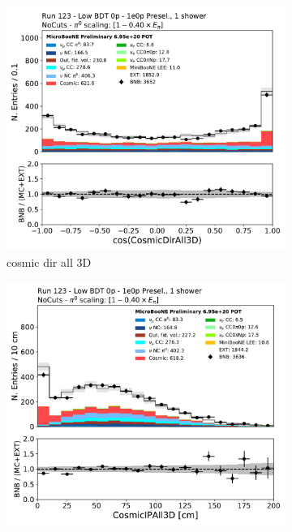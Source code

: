 \begin{figure}[H]
    \centering
    \begin{subfigure}{0.3\textwidth}
    \includegraphics[width=1.0\textwidth]{1e0p/Low_BDT_Sideband/CosmicDirAll3D.pdf}
    \caption{cosmic dir all 3D}
    \end{subfigure}
    \begin{subfigure}{0.3\textwidth}
    \includegraphics[width=1.0\textwidth]{1e0p/Low_BDT_Sideband/CosmicIPAll3D.pdf}

\end{subfigure}
\end{figure}
